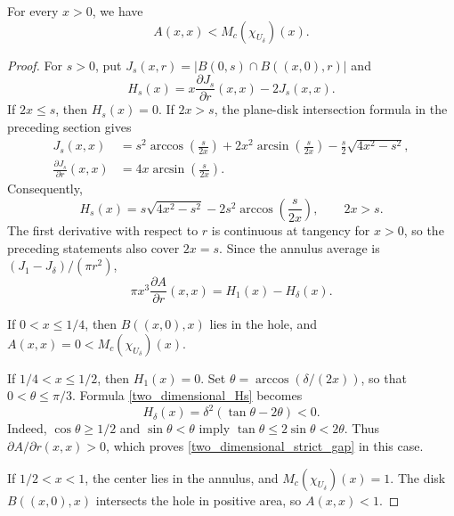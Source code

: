 \documentclass[10pt,a4paper]{amsart}
\begin{document}
\begin{lemma}
\label{two_dimensional_diagonal_gap}
For every $x>0$, we have
\begin{equation}
\label{two_dimensional_strict_gap}
A(x,x)<M_c(\chi_{U_\delta})(x).
\end{equation}
\end{lemma}

\begin{proof}
For $s>0$, put $J_s(x,r)=|B(0,s)\cap B((x,0),r)|$ and
\[
H_s(x)=x\frac{\partial J_s}{\partial r}(x,x)-2J_s(x,x).
\]
If $2x\leq s$, then $H_s(x)=0$. If $2x>s$, the
plane-disk intersection formula in the preceding section gives
\begin{align*}
J_s(x,x)
&=s^2\arccos\!\left(\frac{s}{2x}\right)
 +2x^2\arcsin\!\left(\frac{s}{2x}\right)
 -\frac{s}{2}\sqrt{4x^2-s^2},\\
\frac{\partial J_s}{\partial r}(x,x)
&=4x\arcsin\!\left(\frac{s}{2x}\right).
\end{align*}
Consequently,
\begin{equation}
\label{two_dimensional_Hs}
H_s(x)=s\sqrt{4x^2-s^2}
       -2s^2\arccos\!\left(\frac{s}{2x}\right),\qquad 2x>s.
\end{equation}
The first derivative with respect to $r$ is continuous at tangency
for $x>0$, so the preceding statements also cover $2x=s$.
Since the annulus average is $(J_1-J_\delta)/(\pi r^2)$,
\begin{equation}
\label{two_dimensional_diagonal_derivative}
\pi x^3\frac{\partial A}{\partial r}(x,x)=H_1(x)-H_\delta(x).
\end{equation}

If $0<x\leq1/4$, then $B((x,0),x)$ lies in the hole, and
$A(x,x)=0<M_c(\chi_{U_\delta})(x)$.

If $1/4<x\leq1/2$, then $H_1(x)=0$. Set
$\theta=\arccos(\delta/(2x))$, so that $0<\theta\leq\pi/3$.
Formula \eqref{two_dimensional_Hs} becomes
\[
H_\delta(x)=\delta^2(\tan\theta-2\theta)<0.
\]
Indeed, $\cos\theta\geq1/2$ and $\sin\theta<\theta$ imply
$\tan\theta\leq2\sin\theta<2\theta$.
Thus $\partial A/\partial r(x,x)>0$, which proves
\eqref{two_dimensional_strict_gap} in this case.

If $1/2<x<1$, the center lies in the annulus, and
$M_c(\chi_{U_\delta})(x)=1$. The disk $B((x,0),x)$ intersects the
hole in positive area, so $A(x,x)<1$.


\end{proof}
\end{document}

